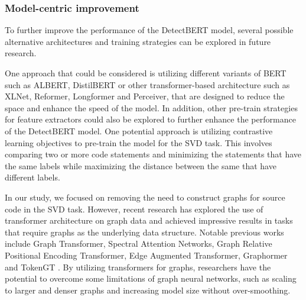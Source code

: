 \documentclass{ieeeaccess}
\begin{document}
\subsubsection{Model-centric improvement}

To further improve the performance of the DetectBERT model, several possible alternative architectures and training strategies can be explored in future research.

One approach that could be considered is utilizing different variants of BERT such as ALBERT\cite{albert}, DistilBERT\cite{distilbert} or other transformer-based architecture such as  XLNet\cite{xlnet}, Reformer\cite{reformer}, Longformer\cite{longformer} and Perceiver\cite{perceiver}, that are designed to reduce the space and enhance the speed of the model. In addition, other pre-train strategies for feature extractors could also be explored to further enhance the performance of the DetectBERT model. One potential approach is utilizing contrastive learning objectives \cite{constrastive_learn} to pre-train the model for the SVD task. This involves comparing two or more code statements and minimizing the statements that have the same labels while maximizing the distance between the same that have different labels.

In our study,  we focused on removing the need to construct graphs for source code in the SVD task. However, recent research has explored the use of transformer architecture on graph data and achieved impressive results in tasks that require graphs as the underlying data structure. Notable previous works include Graph Transformer\cite{graph_trans}, Spectral Attention Networks\cite{spectral}, Graph Relative Positional Encoding Transformer\cite{GRPE}, Edge Augmented Transformer\cite{EGT}, Graphormer\cite{graphormer} and TokenGT \cite{tokengt}. By utilizing transformers for graphs, researchers have the potential to overcome some limitations of graph neural networks, such as scaling to larger and denser graphs and increasing model size without over-smoothing.
\end{document}
